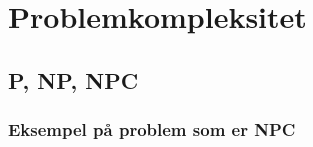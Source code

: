 \section{Problemkompleksitet}
\subsection{P, NP, NPC}
\subsubsection{Eksempel på problem som er NPC}